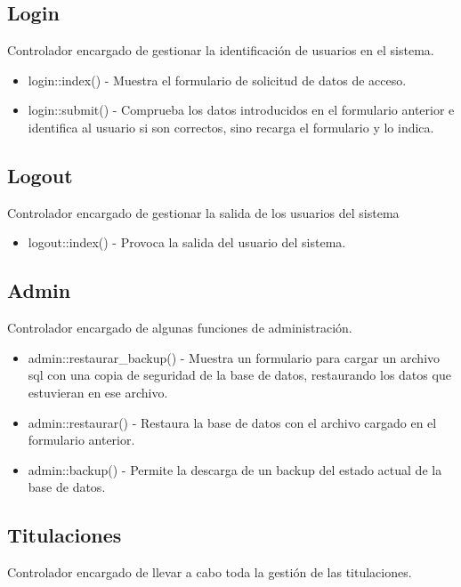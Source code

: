\subsection{Login}

Controlador encargado de gestionar la identificación de usuarios en el sistema.

\begin{itemize}
\item login::index() - Muestra el formulario de solicitud de datos de acceso.
\item login::submit() - Comprueba los datos introducidos en el formulario anterior e identifica al usuario si son correctos, sino recarga el formulario y lo indica.
\end{itemize}

\subsection{Logout}

Controlador encargado de gestionar la salida de los usuarios del sistema

\begin{itemize}
\item logout::index() - Provoca la salida del usuario del sistema.
\end{itemize}

\subsection{Admin}

Controlador encargado de algunas funciones de administración.

\begin{itemize}
\item admin::restaurar\_backup() - Muestra un formulario para cargar un archivo sql con una copia de seguridad de la base de datos, restaurando los datos que estuvieran en ese archivo.
\item admin::restaurar() - Restaura la base de datos con el archivo cargado en el formulario anterior.
\item admin::backup() - Permite la descarga de un backup del estado actual de la base de datos.
\end{itemize}

\subsection{Titulaciones}
Controlador encargado de llevar a cabo toda la gestión de las titulaciones.


